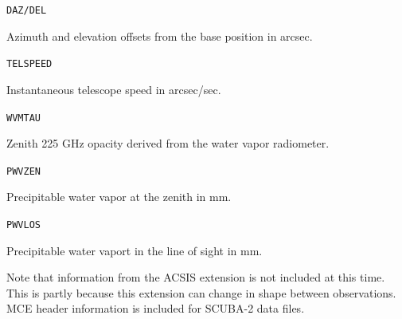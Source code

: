 \documentclass[oneside,11pt]{starlink}
\begin{document}
{{{      \sstitem \texttt{DAZ/DEL}

      Azimuth and elevation offsets from the base position in arcsec.

      \sstitem \texttt{TELSPEED}

      Instantaneous telescope speed in arcsec/sec.

      \sstitem \texttt{WVMTAU}

      Zenith 225 GHz opacity derived from the water vapor radiometer.

      \sstitem \texttt{PWVZEN}

      Precipitable water vapor at the zenith in mm.

      \sstitem \texttt{PWVLOS}

      Precipitable water vaport in the line of sight in mm.

    }

    Note that information from the ACSIS extension is not included at
    this time. This is partly because this extension can change in
    shape between observations.
    MCE header information is included for SCUBA-2 data files.
  }
}
\end{document}
